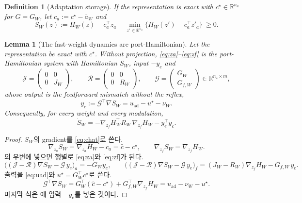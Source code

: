 \documentclass[11pt]{article}\usepackage[margin=1in]{geometry}\usepackage{amsmath,amssymb,amsthm,mathtools}\usepackage{graphicx}\graphicspath{{figures/}{../figures/}{figs/}{./}}\usepackage{enumitem}\usepackage{hyperref}\usepackage{cleveref}\usepackage{tikz}\usetikzlibrary{arrows.meta,positioning,calc,shapes.geometric}\usepackage{float}\usepackage{rotating}\usepackage[most]{tcolorbox}\usepackage{kotex}\usepackage{booktabs}\emergencystretch=1.6em\tolerance=2000 \crefname{assumption}{Assumption}{Assumptions}\Crefname{assumption}{Assumption}{Assumptions}\crefname{definition}{Definition}{Definitions}\Crefname{definition}{Definition}{Definitions}\crefname{proposition}{Proposition}{Propositions}\Crefname{proposition}{Proposition}{Propositions}\crefname{fact}{Fact}{Facts}\Crefname{fact}{Fact}{Facts} \newtheorem{assumption}{Assumption}\newtheorem{definition}{Definition}\newtheorem{lemma}{Lemma}\newtheorem{proposition}{Proposition}\newtheorem{theorem}{Theorem}\newtheorem{corollary}{Corollary}\newtheorem{fact}{Fact}\theoremstyle{remark}\newtheorem{remark}{Remark} \newcommand{\R}{\mathbb{R}}\newcommand{\xb}{\bar x}\newcommand{\Ab}{\bar A}\newcommand{\By}{\bar B_y}\newcommand{\U}{\mathcal U}\newcommand{\Z}{\mathcal Z}
\begin{document}
\begin{definition}[Adaptation storage]
\label{def:storage}
If the representation is exact with $c^\star\in\R^{n_a}$ for $G=G_W$, let $c_a:=c^\star-\bar a_W$ and
\[
S_W(z):=H_W(z)-c_a^\top z_a-\min_{z'\in\R^{n_z}}\big\{H_W(z')-c_a^\top z'_a\big\}\ \ge0 .
\]
\end{definition}

\begin{lemma}[The fast-weight dynamics are port-Hamiltonian]
\label{lem:corepH}
Let the representation be exact with $c^\star$. Without projection, \eqref{eq:za}--\eqref{eq:zf} is the port-Hamiltonian system with Hamiltonian $S_W$, input $-y_e$ and
\[
\mathcal J=\begin{pmatrix}0&0\\0&J_W\end{pmatrix},\qquad \mathcal R=\begin{pmatrix}0&0\\0&R_W\end{pmatrix},\qquad \mathcal G=\begin{pmatrix}G_W\\ G_{f,W}\end{pmatrix}\in\R^{n_z\times m},
\]
whose output is the feedforward mismatch without the reflex,
\[
y_c:=\mathcal G^\top\nabla S_W=u_{\mathrm{ad}}-u^\star-\nu_W .
\]
Consequently, for every weight and every modulation,
\[
\dot S_W=-\nabla_{z_f}H_W^\top R_W\,\nabla_{z_f}H_W-y_e^\top y_c .
\]
\end{lemma}

\begin{proof}
$S_W$의 gradient를 \eqref{eq:chat}로 쓴다.
\[
\nabla_{z_a}S_W=\nabla_{z_a}H_W-c_a=\hat c-c^\star,\qquad \nabla_{z_f}S_W=\nabla_{z_f}H_W .
\]
의 우변에 넣으면 행별로 \eqref{eq:za}와 \eqref{eq:zf}가 된다.
\[
\big((\mathcal J-\mathcal R)\nabla S_W-\mathcal G\,y_e\big)_a=-G_Wy_e,\qquad \big((\mathcal J-\mathcal R)\nabla S_W-\mathcal G\,y_e\big)_f=(J_W-R_W)\nabla_{z_f}H_W-G_{f,W}\,y_e .
\]
출력을 \eqref{eq:uad}와 $u^\star=G_W^\top c^\star$로 쓴다.
\[
\mathcal G^\top\nabla S_W=G_W^\top(\hat c-c^\star)+G_{f,W}^\top\nabla_{z_f}H_W=u_{\mathrm{ad}}-\nu_W-u^\star .
\]
마지막 식은 에 입력 $-y_e$를 넣은 것이다.
\end{proof}
\end{document}
